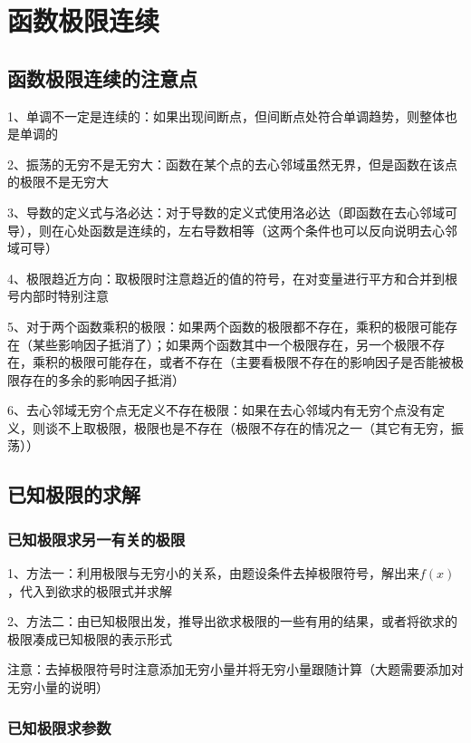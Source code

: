 \chapter{函数极限连续}

\section{函数极限连续的注意点}

1、单调不一定是连续的：如果出现间断点，但间断点处符合单调趋势，则整体也是单调的

2、振荡的无穷不是无穷大：函数在某个点的去心邻域虽然无界，但是函数在该点的极限不是无穷大

3、导数的定义式与洛必达：对于导数的定义式使用洛必达（即函数在去心邻域可导），则在心处函数是连续的，左右导数相等（这两个条件也可以反向说明去心邻域可导）

4、极限趋近方向：取极限时注意趋近的值的符号，在对变量进行平方和合并到根号内部时特别注意

5、对于两个函数乘积的极限：如果两个函数的极限都不存在，乘积的极限可能存在（某些影响因子抵消了）；如果两个函数其中一个极限存在，另一个极限不存在，乘积的极限可能存在，或者不存在（主要看极限不存在的影响因子是否能被极限存在的多余的影响因子抵消）

6、去心邻域无穷个点无定义不存在极限：如果在去心邻域内有无穷个点没有定义，则谈不上取极限，极限也是不存在（极限不存在的情况之一（其它有无穷，振荡））

\section{已知极限的求解}



\subsection{已知极限求另一有关的极限}

1、方法一：利用极限与无穷小的关系，由题设条件去掉极限符号，解出来$ f(x) $，代入到欲求的极限式并求解

2、方法二：由已知极限出发，推导出欲求极限的一些有用的结果，或者将欲求的极限凑成已知极限的表示形式

注意：去掉极限符号时注意添加无穷小量并将无穷小量跟随计算（大题需要添加对无穷小量的说明）



\subsection{已知极限求参数}

